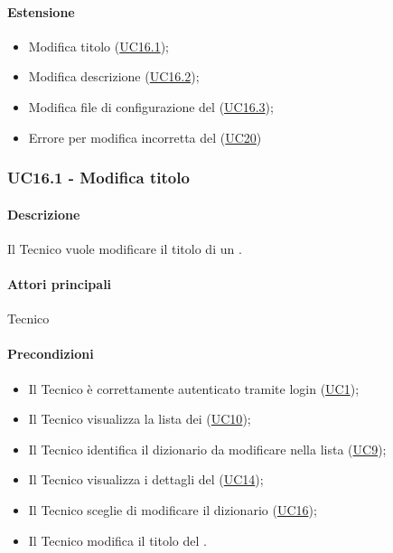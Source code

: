 \paragraph*{Estensione}
\begin{itemize}
  \item Modifica titolo  (\hyperref[UC16point1]{UC16.1});
  \item Modifica descrizione  (\hyperref[UC16point2]{UC16.2});
  \item Modifica file di configurazione del  (\hyperref[UC16point3]{UC16.3});
  \item Errore per modifica incorretta del  (\hyperref[UC20]{UC20})
\end{itemize}


\subsubsection{UC16.1 - Modifica titolo }\label{UC16point1}
\paragraph*{Descrizione}
Il Tecnico vuole modificare il titolo di un .

\paragraph*{Attori principali}
Tecnico

\paragraph*{Precondizioni}
\begin{itemize}
  \item Il Tecnico è correttamente autenticato tramite login (\hyperref[UC1]{UC1});
  \item Il Tecnico visualizza la lista dei  (\hyperref[UC10]{UC10});
  \item Il Tecnico identifica il dizionario da modificare nella lista (\hyperref[UC9]{UC9});
  \item Il Tecnico visualizza i dettagli del  (\hyperref[UC14]{UC14});
  \item Il Tecnico sceglie di modificare il dizionario (\hyperref[UC16]{UC16});
  \item Il Tecnico modifica il titolo del .
\end{itemize}

